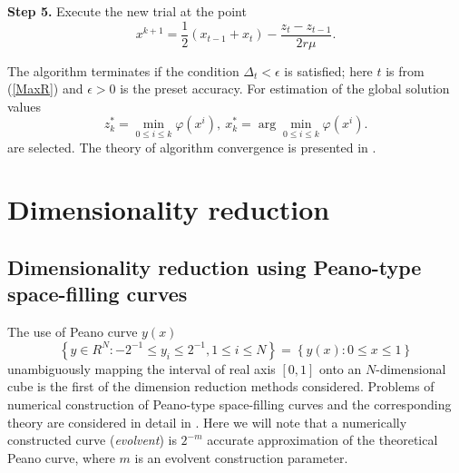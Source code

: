 \documentclass[runningheads]{llncs}
\begin{document}
\textbf{Step 5.} Execute the new trial at the point 
\begin{equation}\label{xk1}
x^{k+1}=\frac{1}{2}(x_{t-1}+x_t) - \frac{z_t-z_{t-1}}{2r\mu}.
\end{equation}

The algorithm terminates if the condition $\Delta_t<\epsilon$ is satisfied; 
here $t$ is from (\ref{MaxR}) and $\epsilon>0$ is the preset accuracy. For 
estimation of the global solution values
\[
z_k^\ast=\min_{0\leq i \leq k}\varphi(x^i), \ x_k^\ast=\arg \min_{0\leq i \leq
 k}\varphi(x^i).
\]
are selected. 
The theory of algorithm convergence is presented in \cite{Strongin2000}.

\section{Dimensionality reduction}
\subsection{Dimensionality reduction using Peano-type space-filling curves}
\label{SectionPeano}

The use of Peano curve $y(x)$ 
\begin{equation}
\left\{y\in R^N: -2^{-1}\leq y_i \leq 2^{-1}, 1 \leq i \leq N\right\}=\left\{
y(x):0\leq x \leq 1 \right\}
\end{equation}
unambiguously mapping the interval of real axis $[0,1]$ onto an 
$N$-dimensional cube is the first of the dimension reduction methods considered.
Problems of numerical construction of Peano-type space-filling curves and the 
corresponding theory are considered in detail in 
\cite{Sergeyev2013,Strongin2000}. Here we will note that a numerically 
constructed curve (\textit{evolvent}) is $2^{-m}$ accurate approximation of 
the theoretical Peano curve, where $m$ is an evolvent construction parameter.
\end{document}
